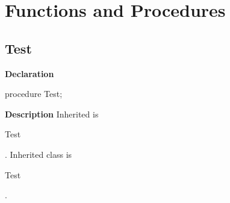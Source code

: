 \documentclass{report}
\newif\ifpdf
\begin{document}
\section{Functions and Procedures}
\ifpdf
\subsection*{\large{\textbf{Test}}\normalsize\hspace{1ex}\hrulefill}
\else
\subsection*{Test}
\fi
\label{warning_inherited_test-Test}
\begin{list}{}{
\setlength{\itemindent}{0cm}
\setlength{\listparindent}{0cm}
\setlength{\leftmargin}{\evensidemargin}
\addtolength{\leftmargin}{\tmplength}
\settowidth{\labelsep}{X}
\addtolength{\leftmargin}{\labelsep}
\setlength{\labelwidth}{\tmplength}
}
\item[\textbf{Declaration}\hfill]
\ifpdf
\begin{flushleft}
\fi
\begin{ttfamily}
procedure Test;\end{ttfamily}

\ifpdf
\end{flushleft}
\fi

\par
\item[\textbf{Description}]
Inherited is \begin{ttfamily}Test\end{ttfamily}. Inherited class is \begin{ttfamily}Test\end{ttfamily}.

\end{list}
\end{document}
